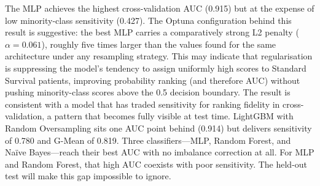 \documentclass[preprint,12pt]{elsarticle}
\begin{document}
\begin{table}[ht!]
  \centering
  \caption{Best cross-validation results per classifier (Optuna, 70 combinations,
    15-fold repeated CV). Sensitivity and specificity refer to the Short Survivor
    (minority) class. G-Mean $= \sqrt{\text{Sensitivity} \times \text{Specificity}}$.}
  \label{tab:cv}
\end{table}

The MLP achieves the highest cross-validation AUC (0.915) but at the expense of
low minority-class sensitivity (0.427). The Optuna configuration behind this result is suggestive: the best MLP carries a comparatively strong L2 penalty
($\alpha = 0.061$), roughly five times larger than the values found for the same
architecture under any resampling strategy. This may indicate that regularisation
is suppressing the model's tendency to assign uniformly high scores to Standard Survival patients,
improving probability ranking (and therefore AUC) without pushing minority-class
scores above the 0.5 decision boundary. The result is consistent with a model
that has traded sensitivity for ranking fidelity in cross-validation, a pattern
that becomes fully visible at test time.
LightGBM with Random Oversampling sits one AUC point behind (0.914) but delivers
sensitivity of 0.780 and G-Mean of 0.819. Three classifiers---MLP, Random Forest,
and Naïve Bayes---reach their best AUC with no imbalance correction at all.
For MLP and Random Forest, that high AUC coexists with poor sensitivity. The
held-out test will make this gap impossible to ignore.
\end{document}
